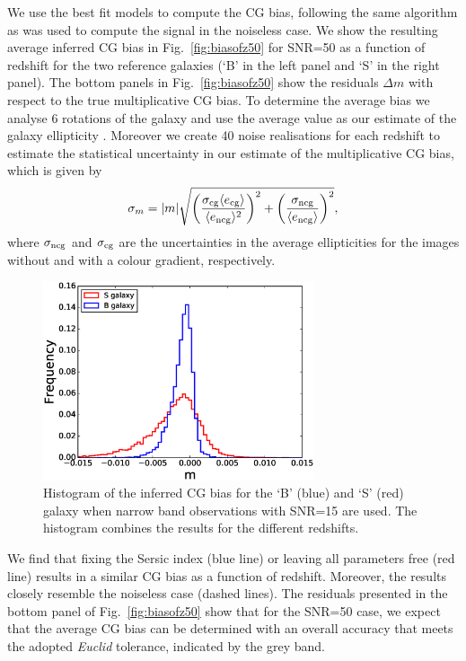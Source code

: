 \documentclass[useAMS,usenatbib]{mnras}
\newcommand{\be}{\begin{equation}}
\newcommand{\ee}{\end{equation}}
\newcommand{\rund}[1]{\left(#1\right)}
\def\elabel#1{\label{eq:#1}}
\begin{document}
We use the best fit models to compute the CG bias, following the same
algorithm as was used to compute the signal in the noiseless case. 
We show the resulting average inferred CG bias in Fig.~\ref{fig:biasofz50} for SNR=50 as a function
of redshift for the two reference galaxies (`B' in the left panel and `S' in the
right panel). The bottom panels in Fig.~\ref{fig:biasofz50} show the residuals 
$\Delta m$ with respect to the true multiplicative CG bias. To  determine the average
bias we analyse 6 rotations of the galaxy and use the average value as our estimate of 
the galaxy ellipticity \citep{Nakajima07}.  Moreover we create 40 noise realisations for 
each redshift to estimate the statistical uncertainty in our estimate of the multiplicative
CG bias, which is given by
%
\be
\sigma_m= |m| \sqrt{\rund{\sigma_{\rm cg} \langle e_{\rm cg} \rangle \over \langle e_{\rm ncg}\rangle^2 }^2
  + \rund{\sigma_{\rm ncg} \over \langle e_{\rm ncg} \rangle}^2 },
\elabel{sigmam}
\ee
%
where $\sigma_{\rm ncg}$ and $\sigma_{\rm cg}$ are the uncertainties in the average
ellipticities for the images without and with a colour gradient, respectively.

\begin{figure}
  \includegraphics[width=8.0cm]{zs2n15his.eps}
  \caption{Histogram of the inferred CG bias for the `B' (blue) and
  `S' (red) galaxy when narrow band observations with SNR=15
  are used. The histogram combines the results for the different
  redshifts.}
  \label{fig:histogrambias}
\end{figure}
We find that fixing the Sersic index (blue line) or leaving all parameters free (red line)
results in a similar CG bias as a function of redshift. Moreover, the results
closely resemble the noiseless case (dashed lines).  The residuals
presented in the bottom panel of Fig.~\ref{fig:biasofz50} show that 
for the SNR=50 case, we expect that the average CG bias can be determined with an
overall accuracy that meets the adopted {\it Euclid} tolerance, indicated by the grey band.
\end{document}
